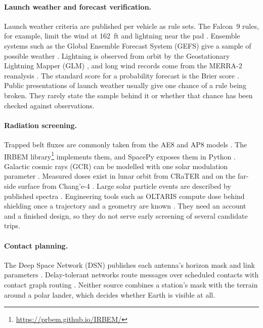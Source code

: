 \documentclass[11pt,a4paper]{article}
\begin{document}
\paragraph{Launch weather and forecast verification.} Launch weather criteria are
published per vehicle as rule sets. The Falcon~9 rules, for example, limit the wind at
\qty{162}{ft} and lightning near the pad \citep{nasa2020wx}. Ensemble systems such as
the Global Ensemble Forecast System (GEFS) give a sample of possible weather
\citep{guan2022}. Lightning is observed from orbit by the Geostationary Lightning Mapper
(GLM) \citep{goodman2013,virts2025}, and long wind records come from the MERRA-2
reanalysis \citep{gelaro2017}. The standard score for a probability forecast is the
Brier score \citep{brier1950}. Public presentations of launch weather usually give one
chance of a rule being broken. They rarely state the sample behind it or whether that
chance has been checked against observations.

\paragraph{Radiation screening.} Trapped belt fluxes are commonly taken from the AE8 and
AP8 models \citep{vette1991,sawyer1976}. The IRBEM
library\footnote{\url{https://prbem.github.io/IRBEM/}} implements them, and SpacePy
exposes them in Python \citep{niehof2022}. Galactic cosmic
rays (GCR) can be modelled with one solar modulation parameter \citep{matthia2013}. Measured doses exist in lunar orbit from CRaTER \citep{schwadron2012} and on the far-side
surface from Chang'e-4 \citep{zhang2020}. Large solar particle events are described by
published spectra \citep{king1974}. Engineering tools such as OLTARIS compute dose behind
shielding once a trajectory and a geometry are known \citep{singleterry2011}. They need
an account and a finished design, so they do not serve early screening of several
candidate trips.

\paragraph{Contact planning.} The Deep Space Network (DSN) publishes each antenna's
horizon mask and link parameters \citep{jpl810005}. Delay-tolerant networks route messages
over scheduled contacts with contact graph routing \citep{araniti2015}. Neither source
combines a station's mask with the terrain around a polar lander, which decides whether
Earth is visible at all.
\end{document}
